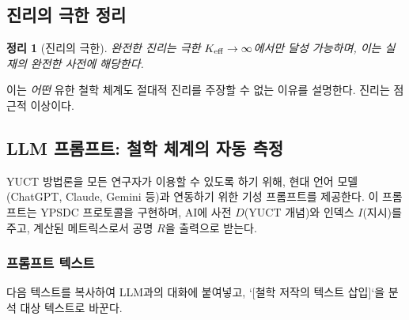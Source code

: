 \documentclass[11pt,a4paper]{article}
\newtheorem{theorem}{정리}[section]
\begin{document}
	\subsection{진리의 극한 정리}
	
	\begin{theorem}[진리의 극한]
		완전한 진리는 극한 \(\Keff \to \infty\)에서만 달성 가능하며, 이는 실재의 완전한 사전에 해당한다.
	\end{theorem}
	
	이는 \emph{어떤} 유한 철학 체계도 절대적 진리를 주장할 수 없는 이유를 설명한다. 진리는 점근적 이상이다.
	
	\subsection{LLM 프롬프트: 철학 체계의 자동 측정}
	\label{sec:llm-prompt}
	
	YUCT 방법론을 모든 연구자가 이용할 수 있도록 하기 위해, 현대 언어 모델(ChatGPT, Claude, Gemini 등)과 연동하기 위한 기성 프롬프트를 제공한다. 이 프롬프트는 YPSDC 프로토콜을 구현하며, AI에 사전 \(D\)(YUCT 개념)와 인덱스 \(I\)(지시)를 주고, 계산된 메트릭스로서 공명 \(R\)을 출력으로 받는다.
	
	\subsubsection{프롬프트 텍스트}
	
	다음 텍스트를 복사하여 LLM과의 대화에 붙여넣고, `[철학 저작의 텍스트 삽입]`을 분석 대상 텍스트로 바꾼다.
	
\end{document}
